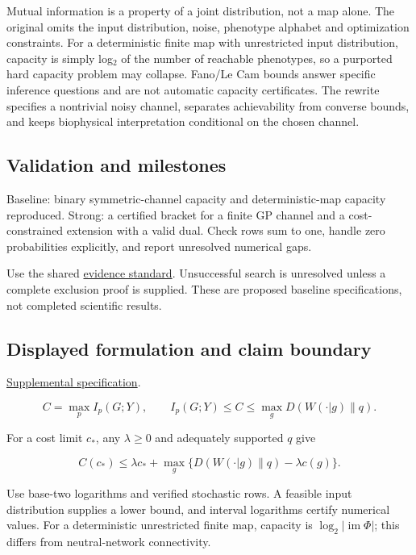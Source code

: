 \documentclass[
  11pt,
]{article}
\begin{document}
Mutual information is a property of a joint distribution, not a map
alone. The original omits the input distribution, noise, phenotype
alphabet and optimization constraints. For a deterministic finite map
with unrestricted input distribution, capacity is simply
log\ensuremath{{}_{2}} of the number of reachable phenotypes, so a
purported hard capacity problem may collapse. Fano/Le Cam bounds answer
specific inference questions and are not automatic capacity
certificates. The rewrite specifies a nontrivial noisy channel,
separates achievability from converse bounds, and keeps biophysical
interpretation conditional on the chosen channel.

\subsection{Validation and milestones}

Baseline: binary symmetric-channel capacity and deterministic-map
capacity reproduced. Strong: a certified bracket for a finite GP channel
and a cost-constrained extension with a valid dual. Check rows sum to
one, handle zero probabilities explicitly, and report unresolved
numerical gaps.

Use the shared
\href{https://github.com/rick-stevens-ai/Pure-Thought/blob/main/reviews/EVIDENCE-STANDARD.md}{evidence
standard}. Unsuccessful search is unresolved unless a complete exclusion
proof is supplied. These are proposed baseline specifications, not
completed scientific results.

\subsection{Displayed formulation and claim boundary}

\href{https://github.com/rick-stevens-ai/Pure-Thought/blob/main/supplemental/S12.md}{Supplemental
specification}.

\[C=\max_p I_p(G;Y),\qquad
I_p(G;Y)\le C\le\max_g D(W(\cdot|g)\|q).\]

For a cost limit \(c_*\), any \(\lambda\ge0\) and adequately supported
\(q\) give

\[C(c_*)\le\lambda c_*+
\max_g\{D(W(\cdot|g)\|q)-\lambda c(g)\}.\]

Use base-two logarithms and verified stochastic rows. A feasible input
distribution supplies a lower bound, and interval logarithms certify
numerical values. For a deterministic unrestricted finite map, capacity
is \(\log_2|\operatorname{im}\Phi|\); this differs from neutral-network
connectivity.
\end{document}
